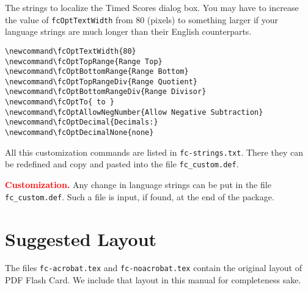 \documentclass{article}
\makeatletter
\let\uif\textsf
\newcommand{\prodName}{\textsf{PDF Flash Card}}
\let\bslash=\@backslashchar
\def\cs#1{\texttt{\bslash#1}}
\makeatother
\begin{document}
The strings to localize the \uif{Timed Scores} dialog box. You may have to increase
the value of \cs{fcOptTextWidth} from 80 (pixels) to something larger if your language strings
are much longer than their English counterparts.
\begin{Verbatim}[xleftmargin=\amtIndent]
\newcommand\fcOptTextWidth{80}
\newcommand\fcOptTopRange{Range Top}
\newcommand\fcOptBottomRange{Range Bottom}
\newcommand\fcOptTopRangeDiv{Range Quotient}
\newcommand\fcOptBottomRangeDiv{Range Divisor}
\newcommand\fcOptTo{ to }
\newcommand\fcOptAllowNegNumber{Allow Negative Subtraction}
\newcommand\fcOptDecimal{Decimals:}
\newcommand\fcOptDecimalNone{none}
\end{Verbatim}
All this customization commands are listed in \texttt{fc-strings.txt}. There they can be
redefined and copy and pasted into the file \texttt{fc\_custom.def}.

\newtopic\noindent\textbf{\textcolor{red}{Customization.}} Any change in language
strings can be put in the file \texttt{fc\_custom.def}. Such a file is input,
if found, at the end of the package.

\section{Suggested Layout}

The files \texttt{fc-acrobat.tex} and \texttt{fc-noacrobat.tex} contain the
original layout of {\prodName}. We include that layout in this manual for
completeness sake.
\end{document}
